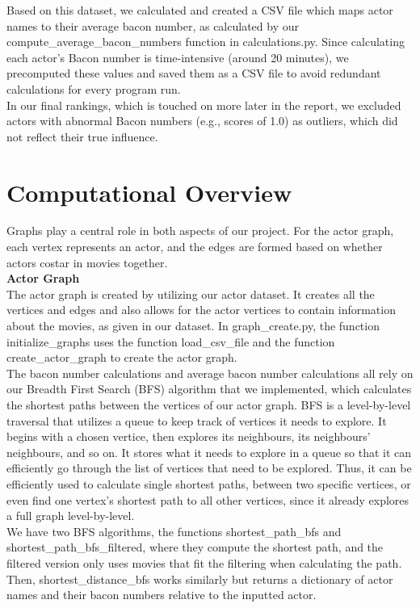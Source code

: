 \documentclass{article}
\begin{document}
Based on this dataset, we calculated and created a CSV file which maps actor names to their average bacon number, as calculated by our compute\_average\_bacon\_numbers function in calculations.py. Since calculating each actor's Bacon number is time-intensive (around 20 minutes), we precomputed these values and saved them as a CSV file to avoid redundant calculations for every program run. \\

In our final rankings, which is touched on more later in the report, we excluded actors with abnormal Bacon numbers (e.g., scores of 1.0) as outliers, which did not reflect their true influence. \\

\section*{Computational Overview}
Graphs play a central role in both aspects of our project. For the actor graph, each vertex represents an actor, and the edges are formed based on whether actors costar in movies together. \\ 

\textbf{Actor Graph}\\
The actor graph is created by utilizing our actor dataset. It creates all the vertices and edges and also allows for the actor vertices to contain information about the movies, as given in our dataset. In graph\_create.py, the function initialize\_graphs uses the function load\_csv\_file and the function create\_actor\_graph to create the actor graph. \\

The bacon number calculations and average bacon number calculations all rely on our Breadth First Search (BFS) algorithm that we implemented, which calculates the shortest paths between the vertices of our actor graph. BFS is a level-by-level traversal that utilizes a queue to keep track of vertices it needs to explore. It begins with a chosen vertice, then explores its neighbours, its neighbours' neighbours, and so on. It stores what it needs to explore in a queue so that it can efficiently go through the list of vertices that need to be explored. Thus, it can be efficiently used to calculate single shortest paths, between two specific vertices, or even find one vertex's shortest path to all other vertices, since it already explores a full graph level-by-level. \\

We have two BFS algorithms, the functions shortest\_path\_bfs and shortest\_path\_bfs\_filtered, where they compute the shortest path, and the filtered version only uses movies that fit the filtering when calculating the path. Then, shortest\_distance\_bfs works similarly but returns a dictionary of actor names and their bacon numbers relative to the inputted actor. \\
\end{document}
